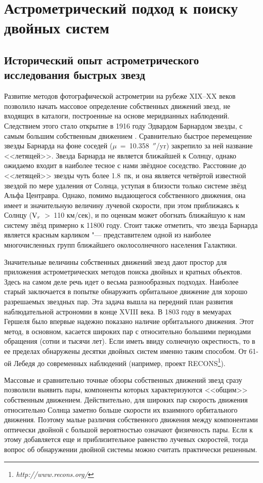 \chapter{Астрометрический подход к поиску двойных систем} \label{ch:ch1}
\section{Исторический опыт астрометрического исследования быстрых звезд} \label{sec:ch1/sec1}
Развитие методов фотографической астрометрии на рубеже XIX--XX веков позволило начать массовое определение собственных движений звезд, не входящих в каталоги, построенные на основе меридианных наблюдений. Следствием этого стало открытие в 1916 году Эдвардом Барнардом звезды, с самым большим собственным движением \cite{1916AJ.....29..181B}. Сравнительно быстрое перемещение звезды Барнарда на фоне соседей ($\mu$~=~10.358~$''$/yr) закрепило за ней название <<летящей>>. Звезда Барнарда не является ближайшей к Солнцу, однако ожидаемо входит в наиболее тесное с нами звёздное соседство. Расстояние до <<летящей>> звезды чуть более 1.8~пк, и она является четвёртой известной звездой по мере удаления от Солнца, уступая в близости только системе звёзд Альфа Центравра. Однако, помимо выдающегося собственного движения, она имеет и значительную величину лучевой скорости, при этом приближаясь к Солнцу (\(\textup{V}_r\)~>~110 км/сек), и по оценкам может обогнать ближайшую к нам систему звёзд примерно к 11800 году. Стоит также отметить, что звезда Барнарда является красным карликом "--- представителем одной из наиболее многочисленных групп ближайшего околосолнечного населения Галактики. 

Значительные величины собственных движений звезд дают простор для приложения астрометрических методов поиска двойных и кратных объектов. Здесь на самом деле речь идет о весьма разнообразных подходах. Наиболее старый заключается в попытке обнаружить орбитальное движение для хорошо разрешаемых звездных пар. Эта задача вышла на передний план развития наблюдательной астрономии в конце XVIII века. В 1803 году в мемуарах Гершеля было впервые надежно показано наличие орбитального движения. Этот метод, в основном, касается широких пар с относительно большими периодами обращения (сотни и тысячи лет). Если иметь ввиду солнечную окрестность, то в ее пределах обнаружены десятки двойных систем именно таким способом. От 61-ой Лебедя до современных наблюдений (например, проект RECONS\footnote{\textit{http://www.recons.org/}}). 

Массовые и сравнительно точные обзоры собственных движений звезд сразу позволили выявить пары, компоненты которых характеризуются <<общим>> собственным движением. Действительно, для широких пар  скорость движения относительно Солнца заметно больше скорости их взаимного орбитального движения. Поэтому малые различия собственного движения между компонентами оптически двойной с большой вероятностью означают физичность пары. Если к этому добавляется еще и приблизительное равенство лучевых скоростей, тогда вопрос об обнаружении двойной системы можно считать практически решенным.

